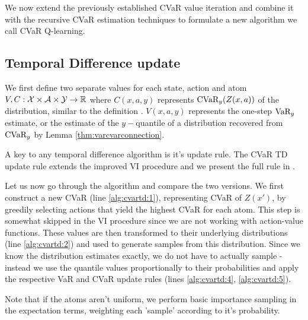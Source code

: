 We now extend the previously established CVaR value iteration and combine it with the recursive CVaR estimation techniques to formulate a new algorithm we call CVaR Q-learning.
\subsection{Temporal Difference update}
We first define two separate values for each state, action and atom $V, C: \mathcal{X}\times\mathcal{A}\times\mathcal{Y}\to\mathbb{R}$ where $C(x, a, y)$ represents $\text{CVaR}_y(Z(x, a))$ of the distribution, similar to the definition . $V(x, a, y)$ represents the one-step $\text{VaR}_y$ estimate, or the estimate of the $y-$quantile of a distribution recovered from $\text{CVaR}_y$ by Lemma \ref{thm:varcvarconnection}.

A key to any temporal difference algorithm is it's update rule. The CVaR TD update rule extends the improved VI procedure and we present the full rule in . 

Let us now go through the algorithm and compare the two versions. We first construct a new CVaR (line \ref{alg:cvartd:1}), representing CVaR of $Z(x')$, by greedily selecting actions that yield the highest CVaR for each atom. This step is somewhat skipped in the VI procedure since we are not working with action-value functions. These values are then transformed to their underlying distributions (line \ref{alg:cvartd:2}) and used to generate samples from this distribution. Since we know the distribution estimates exactly, we do not have to actually sample - instead we use the quantile values proportionally to their probabilities and apply the respective VaR and CVaR update rules (lines \ref{alg:cvartd:4}, \ref{alg:cvartd:5}).

Note that if the atoms aren't uniform, we perform basic importance sampling in the expectation terms, weighting each 'sample' according to it's probability. 



